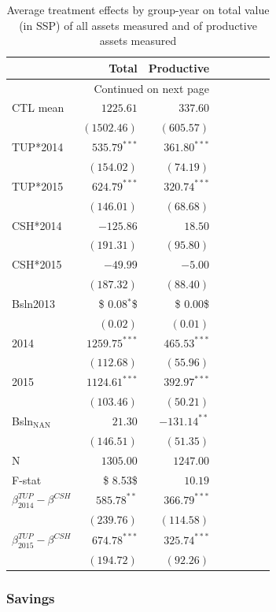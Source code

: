 \documentclass[12pt,article]{article}
\begin{document}
\begin{longtable}{lrrrrrrr}
\caption{\label{tab:assets}Average treatment effects by group-year on total value (in SSP) of all assets measured and of productive assets measured}
\\
\hline
 & Total & Productive\\
\hline
\endhead
\hline\multicolumn{3}{r}{Continued on next page} \\
\endfoot
\endlastfoot
CTL mean & $1225.61$ & $337.60$\\
 & $(1502.46)$ & $(605.57)$\\
\hline
TUP*2014 & $535.79^{***}$ & $361.80^{***}$\\
 & $(154.02)$ & $(74.19)$\\
TUP*2015 & $624.79^{***}$ & $320.74^{***}$\\
 & $(146.01)$ & $(68.68)$\\
CSH*2014 & $-125.86$ & $18.50$\\
 & $(191.31)$ & $(95.80)$\\
CSH*2015 & $-49.99$ & $-5.00$\\
 & $(187.32)$ & $(88.40)$\\
Bsln2013 & \$ 0.08$^{\textbf{*}}$\$ & \$ 0.00\$\\
 & $( 0.02)$ & $( 0.01)$\\
2014 & $1259.75^{***}$ & $465.53^{***}$\\
 & $(112.68)$ & $(55.96)$\\
2015 & $1124.61^{***}$ & $392.97^{***}$\\
 & $(103.46)$ & $(50.21)$\\
Bsln$_{\text{NAN}}$ & $21.30$ & $-131.14^{**}$\\
 & $(146.51)$ & $(51.35)$\\
\hline
N & $1305.00$ & $1247.00$\\
F-stat & \$ 8.53\$ & $10.19$\\
\hline
$\beta^{TUP}_{2014}-\beta^{CSH}$ & $585.78^{**}$ & $366.79^{***}$\\
 & $(239.76)$ & $(114.58)$\\
$\beta^{TUP}_{2015}-\beta^{CSH}$ & $674.78^{***}$ & $325.74^{***}$\\
 & $(194.72)$ & $(92.26)$\\
\hline
\end{longtable}


\subsubsection{Savings}
\label{sec-3-5-2}
\end{document}

